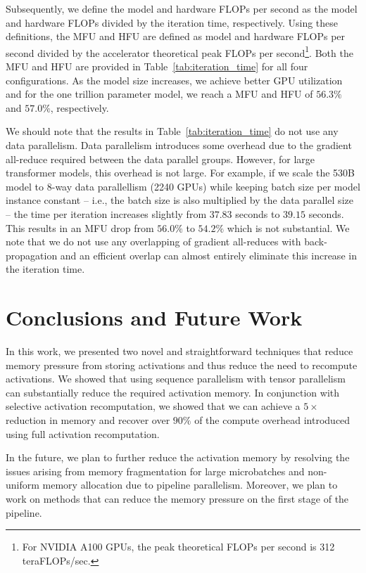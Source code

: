 \documentclass{article}
\begin{document}
Subsequently, we define the model and hardware FLOPs per second as the model and hardware FLOPs divided by the iteration time, respectively. Using these definitions, the MFU and HFU are defined as model and hardware FLOPs per second divided by the accelerator theoretical peak FLOPs per second\footnote{For NVIDIA A100 GPUs, the peak theoretical FLOPs per second is 312 teraFLOPs/sec.}. Both the MFU and HFU are provided in Table~\ref{tab:iteration_time} for all four configurations. As the model size increases, we achieve better GPU utilization and for the one trillion parameter model, we reach a MFU and HFU of $56.3\%$ and $57.0\%$, respectively.

We should note that the results in Table~\ref{tab:iteration_time} do not use any data parallelism. Data parallelism introduces some overhead due to the gradient all-reduce required between the data parallel groups. However, for large transformer models, this overhead is not large. For example, if we scale the 530B model to 8-way data parallellism (2240 GPUs) while keeping batch size per model instance constant -- i.e., the batch size is also multiplied by the data parallel size -- the time per iteration increases slightly from $37.83$ seconds to $39.15$ seconds. This results in an MFU drop from $56.0\%$ to $54.2\%$ which is not substantial. We note that we do not use any overlapping of gradient all-reduces with back-propagation and an efficient overlap can almost entirely eliminate this increase in the iteration time.




\section{Conclusions and Future Work}
\label{sec:conclusions}

In this work, we presented two novel and straightforward techniques that reduce memory pressure from storing activations and thus reduce the need to recompute activations. We showed that using sequence parallelism with tensor parallelism can substantially reduce the required activation memory. In conjunction with selective activation recomputation, we showed that we can achieve a $5\times$ reduction in memory and recover over $90\%$ of the compute overhead introduced using full activation recomputation. 

In the future, we plan to further reduce the activation memory by resolving the issues arising from memory fragmentation for large microbatches and non-uniform memory allocation due to pipeline parallelism. Moreover, we plan to work on methods that can reduce the memory pressure on the first stage of the pipeline. 
\end{document}
